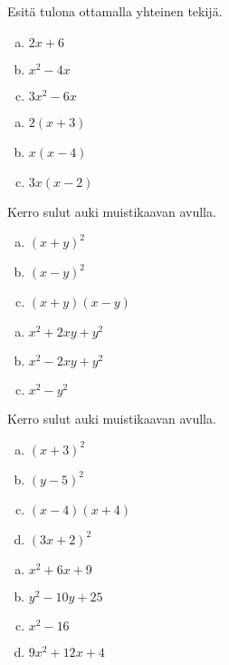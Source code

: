 \begin{tehtava}
    Esitä tulona ottamalla yhteinen tekijä.
    \begin{enumerate}[a)]
        \item $2x+6$
        \item $x^2 -4x$
        \item $3x^2 - 6x$
    \end{enumerate}
    \begin{vastaus}
        \begin{enumerate}[a)]
        \item $2(x+3)$
        \item $x(x-4)$
        \item $3x(x-2)$
        \end{enumerate}
    \end{vastaus}
\end{tehtava}

\begin{tehtava}
    Kerro sulut auki muistikaavan avulla.
    \begin{enumerate}[a)]
        \item $(x+y)^2$
        \item $(x-y)^2$
        \item $(x+y)(x-y)$
    \end{enumerate}
    \begin{vastaus}
        \begin{enumerate}[a)]
        \item $x^2 +2xy+y^2$
        \item $x^2 -2xy +y^2$
        \item $x^2-y^2$
        \end{enumerate}
    \end{vastaus}
\end{tehtava}

\begin{tehtava}
    Kerro sulut auki muistikaavan avulla.
    \begin{enumerate}[a)]
        \item $(x+3)^2$
        \item $(y-5)^2$
        \item $(x-4)(x+4)$
        \item $(3x+2)^2$
    \end{enumerate}
    \begin{vastaus}
        \begin{enumerate}[a)]
        \item $x^2 +6x+9$
        \item $y^2 - 10y+25$
        \item $x^2 -16$
        \item $9x^2 +12x +4$
        \end{enumerate}
    \end{vastaus}
\end{tehtava}

